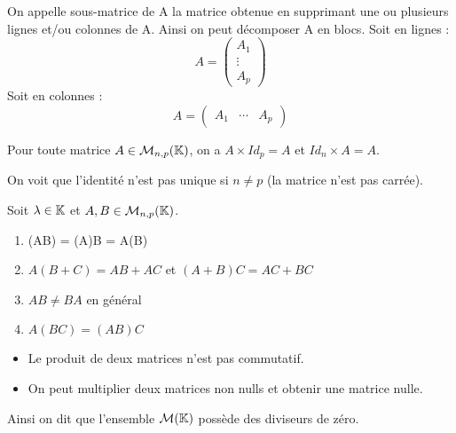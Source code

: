 \documentclass[a4paper, 12pt]{article}
\begin{document}
\begin{definition}
    On appelle sous-matrice de A la matrice obtenue en supprimant une ou plusieurs lignes et/ou colonnes de A.
    Ainsi on peut décomposer A en blocs.
    Soit en lignes :
    $$
        A = \begin{pmatrix}
            A_1 \\
            \vdots \\
            A_p
        \end{pmatrix}
    $$
    Soit en colonnes :
    $$
        A = \begin{pmatrix}
            A_1 & \cdots & A_p
        \end{pmatrix}
    $$
\end{definition}

\begin{propriete}{}{}
    Pour toute matrice $A \in \mathcal{M}_{n, p}(\mathbb{K})$, on a
    $A \times Id_p = A$ et $Id_n \times A = A$.
\end{propriete}

\begin{remarque}
    On voit que l'identité n'est pas unique si $n \neq p$ (la matrice n'est pas carrée).
\end{remarque}

\begin{propriete}{}{}
    Soit $\lambda \in \mathbb{K}$ et $A, B \in \mathcal{M}_{n, p}(\mathbb{K})$.
    \begin{enumerate}
        \item \lambda(AB) = (\lambda A)B = A(\lambda B)
        \item $A(B + C) = AB + AC$ et $(A + B)C = AC + BC$
        \item $AB \neq BA$ en général
        \item $A(BC) = (AB)C$
    \end{enumerate}
\end{propriete}

\begin{remarque}
    \begin{itemize}.
        \item Le produit de deux matrices n'est pas commutatif.
        \item On peut multiplier deux matrices non nulls et obtenir une matrice nulle.
    \end{itemize}
    Ainsi on dit que l'ensemble $\mathcal{M}(\mathbb{K})$ possède des diviseurs de zéro.
\end{remarque}
\end{document}
